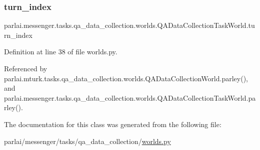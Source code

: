 \subsubsection{\texorpdfstring{turn\+\_\+index}{turn\_index}}
{\footnotesize\ttfamily parlai.\+messenger.\+tasks.\+qa\+\_\+data\+\_\+collection.\+worlds.\+Q\+A\+Data\+Collection\+Task\+World.\+turn\+\_\+index}



Definition at line 38 of file worlds.\+py.



Referenced by parlai.\+mturk.\+tasks.\+qa\+\_\+data\+\_\+collection.\+worlds.\+Q\+A\+Data\+Collection\+World.\+parley(), and parlai.\+messenger.\+tasks.\+qa\+\_\+data\+\_\+collection.\+worlds.\+Q\+A\+Data\+Collection\+Task\+World.\+parley().



The documentation for this class was generated from the following file\+:\begin{DoxyCompactItemize}
\item 
parlai/messenger/tasks/qa\+\_\+data\+\_\+collection/\hyperlink{parlai_2messenger_2tasks_2qa__data__collection_2worlds_8py}{worlds.\+py}\end{DoxyCompactItemize}
